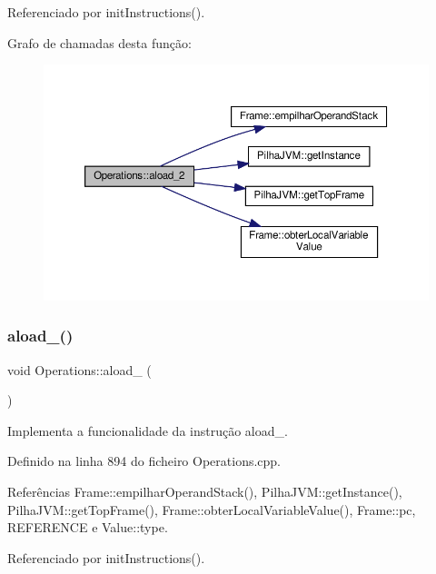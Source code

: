 Referenciado por init\+Instructions().

Grafo de chamadas desta função\+:
\nopagebreak
\begin{figure}[H]
\begin{center}
\leavevmode
\includegraphics[width=350pt]{classOperations_abd58f463152d7f88b9fb2f133c6ca184_cgraph}
\end{center}
\end{figure}
\mbox{\label{classOperations_ac0cadd4fe7c17eab1985f11b5389fafc}} 
\subsubsection{\texorpdfstring{aload\+\_()}{aload\_3()}}
{\footnotesize\ttfamily void Operations\+::aload\+\_ (\begin{DoxyParamCaption}{ }\end{DoxyParamCaption})\hspace{0.3cm}{\ttfamily [private]}}



Implementa a funcionalidade da instrução aload\+\_. 



Definido na linha 894 do ficheiro Operations.\+cpp.



Referências Frame\+::empilhar\+Operand\+Stack(), Pilha\+J\+V\+M\+::get\+Instance(), Pilha\+J\+V\+M\+::get\+Top\+Frame(), Frame\+::obter\+Local\+Variable\+Value(), Frame\+::pc, R\+E\+F\+E\+R\+E\+N\+CE e Value\+::type.



Referenciado por init\+Instructions().

